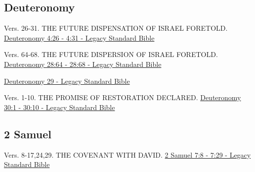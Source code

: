 \documentclass[
  ignorenonframetext,
]{beamer}
\begin{document}
\subsection{Deuteronomy}\label{deuteronomy}

\begin{frame}{4}
\label{section-8}
\begin{block}{Vers. 26-31. THE FUTURE DISPENSATION OF ISRAEL FORETOLD.}
\label{vers.-26-31.-the-future-dispensation-of-israel-foretold.}
\href{https://read.lsbible.org/?q=deut4\%3A26-31}{Deuteronomy 4:26 -
4:31 - Legacy Standard Bible}
\end{block}
\end{frame}

\begin{frame}{28}
\label{section-9}
\begin{block}{Vers. 64-68. THE FUTURE DISPERSION OF ISRAEL FORETOLD.}
\label{vers.-64-68.-the-future-dispersion-of-israel-foretold.}
\href{https://read.lsbible.org/?q=deut28\%3A64-68}{Deuteronomy 28:64 -
28:68 - Legacy Standard Bible}
\end{block}
\end{frame}

\begin{frame}{29}
\label{section-10}
\href{https://read.lsbible.org/?q=deut29}{Deuteronomy 29 - Legacy
Standard Bible}
\end{frame}

\begin{frame}{30}
\label{section-11}
\begin{block}{Vers. 1-10. THE PROMISE OF RESTORATION DECLARED.}
\label{vers.-1-10.-the-promise-of-restoration-declared.}
\href{https://read.lsbible.org/?q=deut30\%3A1-10}{Deuteronomy 30:1 -
30:10 - Legacy Standard Bible}
\end{block}
\end{frame}

\subsection{2 Samuel}\label{samuel}

\begin{frame}{7}
\label{section-12}
\begin{block}{Vers. 8-17,24,29. THE COVENANT WITH DAVID.}
\label{vers.-8-172429.-the-covenant-with-david.}
\href{https://read.lsbible.org/?q=2sam7\%3A8-29}{2 Samuel 7:8 - 7:29 -
Legacy Standard Bible}
\end{block}
\end{frame}
\end{document}
